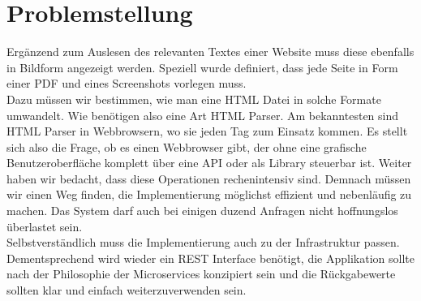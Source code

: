 \section{Problemstellung}
Ergänzend zum Auslesen des relevanten Textes einer Website muss diese ebenfalls in Bildform angezeigt werden. Speziell wurde definiert, dass jede Seite in Form einer PDF und eines Screenshots vorlegen muss. \\
Dazu müssen wir bestimmen, wie man eine HTML Datei in solche Formate umwandelt. Wie benötigen also eine Art HTML Parser. Am bekanntesten sind HTML Parser in Webbrowsern, wo sie jeden Tag zum Einsatz kommen. Es stellt sich also die Frage, ob es einen Webbrowser gibt, der ohne eine grafische Benutzeroberfläche komplett über eine API oder als Library steuerbar ist.
Weiter haben wir bedacht, dass diese Operationen rechenintensiv sind. Demnach müssen wir einen Weg finden, die Implementierung möglichst effizient und nebenläufig zu machen. Das System darf auch bei einigen duzend Anfragen nicht hoffnungslos überlastet sein. \\
Selbstverständlich muss die Implementierung auch zu der Infrastruktur passen. Dementsprechend wird wieder ein REST Interface benötigt, die Applikation sollte nach der Philosophie der Microservices konzipiert sein und die Rückgabewerte sollten klar und einfach weiterzuverwenden sein.